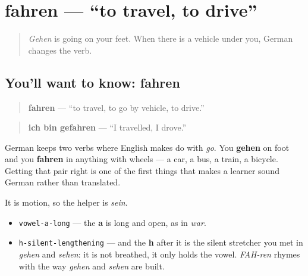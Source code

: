 \section[fahren]{fahren — \textquotedblleft{}to travel, to drive\textquotedblright{}}

\label{lesson:GE-C16-fahren}



\begin{quote}
\emph{Gehen} is going on your feet. When there is a vehicle under you, German changes the verb.
\end{quote}

\subsection*{You'll want to know: fahren}
\begin{quote}
\textbf{fahren} — \textquotedblleft{}to travel, to go by vehicle, to drive.\textquotedblright{}
\end{quote}

\begin{quote}
\textbf{ich bin gefahren} — \textquotedblleft{}I travelled, I drove.\textquotedblright{}
\end{quote}

German keeps two verbs where English makes do with \emph{go}. You \textbf{gehen} on foot and you \textbf{fahren} in anything with wheels — a car, a bus, a train, a bicycle. Getting that pair right is one of the first things that makes a learner sound German rather than translated.

It is motion, so the helper is \emph{sein}.

\begin{sounds}
\begin{itemize}
\raggedright
  \item \texttt{vowel-a-long} — the \textbf{a} is long and open, as in \emph{war}.
  \item \texttt{h-silent-lengthening} — and the \textbf{h} after it is the silent stretcher you met in \emph{gehen} and \emph{sehen}: it is not breathed, it only holds the vowel. \emph{FAH-ren} rhymes with the way \emph{gehen} and \emph{sehen} are built.
\end{itemize}
\end{sounds}


